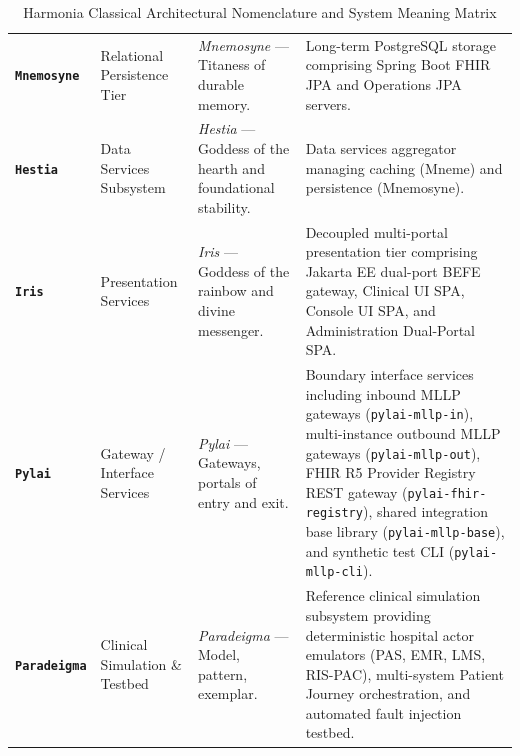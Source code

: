 \begin{table}[htbp]
\begin{tabularx}{\textwidth}{l p{3.2cm} p{3.5cm} X}
\addlinespace
\textbf{\texttt{Mnemosyne}} & Relational Persistence Tier & \textit{Mnemosyne} --- Titaness of durable memory. & Long-term PostgreSQL storage comprising Spring Boot FHIR JPA and Operations JPA servers. \\
\addlinespace
\textbf{\texttt{Hestia}} & Data Services Subsystem & \textit{Hestia} --- Goddess of the hearth and foundational stability. & Data services aggregator managing caching (Mneme) and persistence (Mnemosyne). \\
\addlinespace
\textbf{\texttt{Iris}} & Presentation Services & \textit{Iris} --- Goddess of the rainbow and divine messenger. & Decoupled multi-portal presentation tier comprising Jakarta EE dual-port BEFE gateway, Clinical UI SPA, Console UI SPA, and Administration Dual-Portal SPA. \\
\addlinespace
\textbf{\texttt{Pylai}} & Gateway / Interface Services & \textit{Pylai} --- Gateways, portals of entry and exit. & Boundary interface services including inbound MLLP gateways (\texttt{pylai-mllp-in}), multi-instance outbound MLLP gateways (\texttt{pylai-mllp-out}), FHIR R5 Provider Registry REST gateway (\texttt{pylai-fhir-registry}), shared integration base library (\texttt{pylai-mllp-base}), and synthetic test CLI (\texttt{pylai-mllp-cli}). \\
\addlinespace
\textbf{\texttt{Paradeigma}} & Clinical Simulation \& Testbed & \textit{Paradeigma} --- Model, pattern, exemplar. & Reference clinical simulation subsystem providing deterministic hospital actor emulators (PAS, EMR, LMS, RIS-PAC), multi-system Patient Journey orchestration, and automated fault injection testbed. \\
\bottomrule
\end{tabularx}
\caption{Harmonia Classical Architectural Nomenclature and System Meaning Matrix}
\label{tab:system_nomenclature}
\end{table}

\newpage
